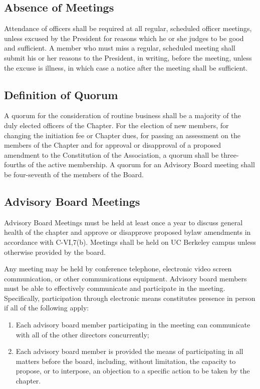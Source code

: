 \documentclass{article}
\begin{document}
	\subsection{Absence of Meetings}
	Attendance of officers shall be required at all regular, scheduled officer meetings, unless excused by the President for reasons which he or she judges to be good and sufficient. A member who must miss a regular, scheduled meeting shall submit his or her reasons to the President, in writing, before the meeting, unless the excuse is illness, in which case a notice after the meeting shall be sufficient.
	
	\subsection{Definition of Quorum}
	A quorum for the consideration of routine business shall be a majority of the duly elected officers of the Chapter. For the election of new members, for changing the initiation fee or Chapter dues, for passing an assessment on the members of the Chapter and for approval or disapproval of a proposed amendment to the Constitution of the Association, a quorum shall be three-fourths of the active membership. A quorum for an Advisory Board meeting shall be four-seventh of the members of the Board.
	
	\subsection{Advisory Board Meetings}
	Advisory Board Meetings must be held at least once a year to discuss general health of the chapter and approve or disapprove proposed bylaw amendments in accordance with C-VI,7(b). Meetings shall be held on UC Berkeley campus unless otherwise provided by the board.
	
	Any meeting may be held by conference telephone, electronic video screen communication, or other communications equipment. Advisory board members must be able to effectively communicate and participate in the meeting. Specifically, participation through electronic means constitutes presence in person if all of the following apply:
	\begin{enumerate}[\indent (a)]
		\item Each advisory board member participating in the meeting can communicate with all of the other directors concurrently;
		\item	Each advisory board member is provided the means of participating in all matters before the board, including, without limitation, the capacity to propose, or to interpose, an objection to a specific action to be taken by the chapter.
	\end{enumerate}
	
\end{document}
